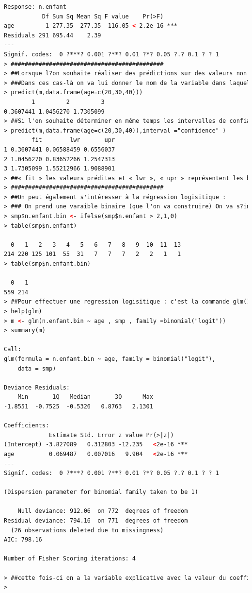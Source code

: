 \begin{lstlisting}[language=html]
Response: n.enfant
           Df Sum Sq Mean Sq F value    Pr(>F)    
age         1 277.35  277.35  116.05 < 2.2e-16 ***
Residuals 291 695.44    2.39                      
---
Signif. codes:  0 ?***? 0.001 ?**? 0.01 ?*? 0.05 ?.? 0.1 ? ? 1
> ############################################
> ##Lorsque l?on souhaite réaliser des prédictions sur des valeurs non nécessairement observées on peut utiliser la commande predict().
> ###Dans ces cas-là on va lui donner le nom de la variable dans laquelle on a stocké notre modèle de régression et un data-frame dans lequel on va indiquer pour la variable qui sert de variable explicative les valeurs pour lesquelles on souhaite effectuer la prédiction.
> predict(m,data.frame(age=c(20,30,40)))
        1         2         3 
0.3607441 1.0456270 1.7305099 
> ##Si l'on souhaite déterminer en même temps les intervalles de confiances :
> predict(m,data.frame(age=c(20,30,40)),interval ="confidence" )
        fit        lwr       upr
1 0.3607441 0.06588459 0.6556037
2 1.0456270 0.83652266 1.2547313
3 1.7305099 1.55212966 1.9088901
> ##« fit » les valeurs prédites et « lwr », « upr » représentent les bornes inférieures et supérieures des intervalles de confiance à 95% pour la prévision.
> ############################################
> ##On peut également s'intéresser à la régression logisitique :
> ### On prend une varaible binaire (que l'on va construire) On va s?intéresser au nombre d?enfants supérieur à 2. Dans ces cas-là on codera 1 sinon on code 0
> smp$n.enfant.bin <- ifelse(smp$n.enfant > 2,1,0)
> table(smp$n.enfant)

  0   1   2   3   4   5   6   7   8   9  10  11  13 
214 220 125 101  55  31   7   7   7   2   2   1   1 
> table(smp$n.enfant.bin)

  0   1 
559 214 
> ##Pour effectuer une regression logisitique : c'est la commande glm() : Generalized Linear Models
> help(glm)
> m <- glm(n.enfant.bin ~ age , smp , family =binomial("logit"))
> summary(m)

Call:
glm(formula = n.enfant.bin ~ age, family = binomial("logit"), 
    data = smp)

Deviance Residuals: 
    Min       1Q   Median       3Q      Max  
-1.8551  -0.7525  -0.5326   0.8763   2.1301  

Coefficients:
             Estimate Std. Error z value Pr(>|z|)    
(Intercept) -3.827089   0.312803 -12.235   <2e-16 ***
age          0.069487   0.007016   9.904   <2e-16 ***
---
Signif. codes:  0 ?***? 0.001 ?**? 0.01 ?*? 0.05 ?.? 0.1 ? ? 1

(Dispersion parameter for binomial family taken to be 1)

    Null deviance: 912.06  on 772  degrees of freedom
Residual deviance: 794.16  on 771  degrees of freedom
  (26 observations deleted due to missingness)
AIC: 798.16

Number of Fisher Scoring iterations: 4

> ##cette fois-ci on a la variable explicative avec la valeur du coefficient de régression sur l?échelle du log odds.
> 
\end{lstlisting}

